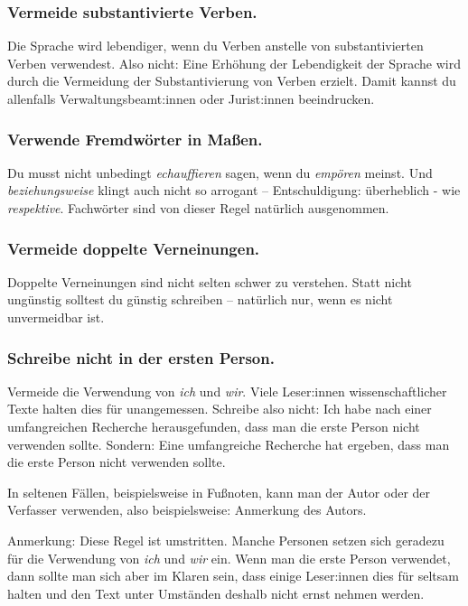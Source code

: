\documentclass{../cssheet}
\begin{document}
\subsubsection*{Vermeide substantivierte Verben.}

Die Sprache wird lebendiger, wenn du Verben anstelle von
substantivierten Verben verwendest. Also nicht: \glqq{}Eine Erhöhung der
Lebendigkeit der Sprache wird durch die Vermeidung der Substantivierung
von Verben erzielt.\grqq{} Damit kannst du allenfalls Verwaltungsbeamt:innen oder
Jurist:innen beeindrucken.


\subsubsection*{Verwende Fremdwörter in Maßen.}

Du musst nicht unbedingt \emph{echauffieren} sagen, wenn du
\emph{empören} meinst. Und \emph{beziehungsweise} klingt auch nicht so
arrogant -- Entschuldigung: überheblich - wie \emph{respektive}.
Fachwörter sind von dieser Regel natürlich ausgenommen.

\subsubsection*{Vermeide doppelte Verneinungen.}

Doppelte Verneinungen sind nicht selten schwer zu verstehen. Statt
\glqq{}nicht ungünstig\grqq{} solltest du \glqq{}günstig\grqq{} schreiben -- natürlich nur, wenn
es nicht unvermeidbar ist.

\subsubsection*{Schreibe nicht in der ersten Person.}

Vermeide die Verwendung von \emph{ich} und \emph{wir}. Viele Leser:innen wissenschaftlicher
Texte halten dies für unangemessen. Schreibe also nicht: \glqq{}Ich habe nach
einer umfangreichen Recherche herausgefunden, dass man die erste Person
nicht verwenden sollte.\grqq{} Sondern: \glqq{}Eine umfangreiche Recherche hat
ergeben, dass man die erste Person nicht verwenden sollte.\grqq{}

In seltenen Fällen, beispielsweise in Fußnoten, kann man \glqq{}der Autor\grqq{}
oder \glqq{}der Verfasser\grqq{} verwenden, also beispielsweise: \glqq{}Anmerkung des
Autors\grqq{}.

Anmerkung: Diese Regel ist umstritten. Manche
Personen setzen sich geradezu für die Verwendung von \emph{ich} und \emph{wir} ein.
Wenn man die erste Person verwendet, dann sollte man sich aber im Klaren
sein, dass einige Leser:innen dies für seltsam halten und den Text unter
Umständen deshalb nicht ernst nehmen werden.
\end{document}
